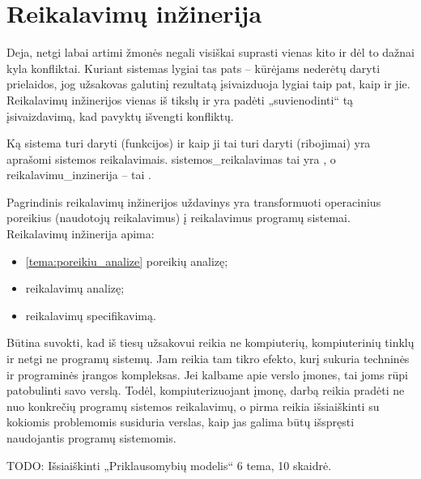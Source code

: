 \chapter{Reikalavimų inžinerija}

\begin{kmt}
  Deja, netgi labai artimi žmonės negali visiškai suprasti vienas kito
  ir dėl to dažnai kyla konfliktai. Kuriant sistemas lygiai tas pats
  – kūrėjams nederėtų daryti prielaidos, jog užsakovas galutinį rezultatą
  įsivaizduoja lygiai taip pat, kaip ir jie. Reikalavimų inžinerijos
  vienas iš tikslų ir yra padėti „suvienodinti“ tą įsivaizdavimą, kad
  pavyktų išvengti konfliktų.
\end{kmt}

Ką sistema turi daryti (funkcijos) ir kaip ji tai turi daryti (ribojimai)
yra aprašomi sistemos reikalavimais. \Gls{sistemos_reikalavimas} tai yra 
, o \gls{reikalavimu_inzinerija} –
tai .

Pagrindinis reikalavimų inžinerijos uždavinys yra transformuoti operacinius
poreikius (naudotojų reikalavimus) į reikalavimus programų sistemai.
Reikalavimų inžinerija apima:
\begin{itemize}
  \item \ref{tema:poreikiu_analize} poreikių analizę;
  \item reikalavimų analizę;
  \item reikalavimų specifikavimą.
\end{itemize}

Būtina suvokti, kad iš tiesų užsakovui reikia ne kompiuterių, kompiuterinių
tinklų ir netgi ne programų sistemų. Jam reikia tam tikro efekto, kurį
sukuria techninės ir programinės įrangos kompleksas. Jei kalbame apie
verslo įmones, tai joms rūpi patobulinti savo verslą. Todėl, 
kompiuterizuojant įmonę, darbą reikia pradėti ne nuo konkrečių programų
sistemos reikalavimų, o pirma reikia išsiaiškinti su kokiomis problemomis
susiduria verslas, kaip jas galima būtų išspręsti naudojantis programų 
sistemomis.

TODO: Išsiaiškinti „Priklausomybių modelis“ 6 tema, 10 skaidrė.
